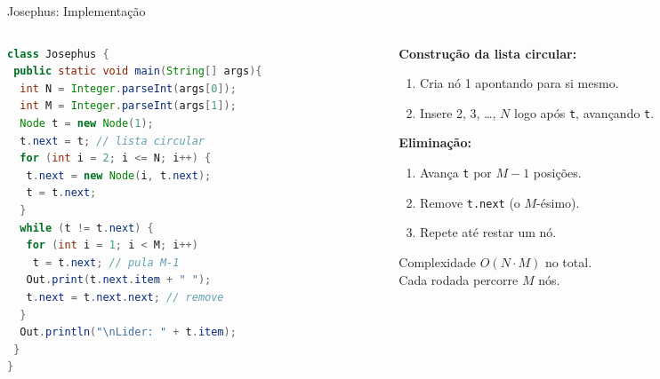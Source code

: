 \documentclass[aspectratio=169]{beamer}
\begin{document}
\begin{frame}{Josephus: Implementação}
    \begin{columns}[T]
        \begin{column}{0.52\textwidth}
            \begin{lstlisting}[language=Java, basicstyle=\ttfamily\tiny,
                keywordstyle=\color{blue}]
class Josephus {
 public static void main(String[] args){
  int N = Integer.parseInt(args[0]);
  int M = Integer.parseInt(args[1]);
  Node t = new Node(1);
  t.next = t; // lista circular
  for (int i = 2; i <= N; i++) {
   t.next = new Node(i, t.next);
   t = t.next;
  }
  while (t != t.next) {
   for (int i = 1; i < M; i++)
    t = t.next; // pula M-1
   Out.print(t.next.item + " ");
   t.next = t.next.next; // remove
  }
  Out.println("\nLider: " + t.item);
 }
}
            \end{lstlisting}
        \end{column}
        \begin{column}{0.46\textwidth}
            \small
            \textbf{Construção da lista circular:}
            \begin{enumerate}
                \item Cria nó 1 apontando para si mesmo.
                \item Insere 2, 3, \ldots, $N$ logo após \texttt{t}, avançando \texttt{t}.
            \end{enumerate}

            \textbf{Eliminação:}
            \begin{enumerate}
                \item Avança \texttt{t} por $M{-}1$ posições.
                \item Remove \texttt{t.next} (o $M$-ésimo).
                \item Repete até restar um nó.
            \end{enumerate}
            \begin{block}{Complexidade}
                $O(N \cdot M)$ no total.\\
                Cada rodada percorre $M$ nós.
            \end{block}
        \end{column}
    \end{columns}
\end{frame}
\end{document}
